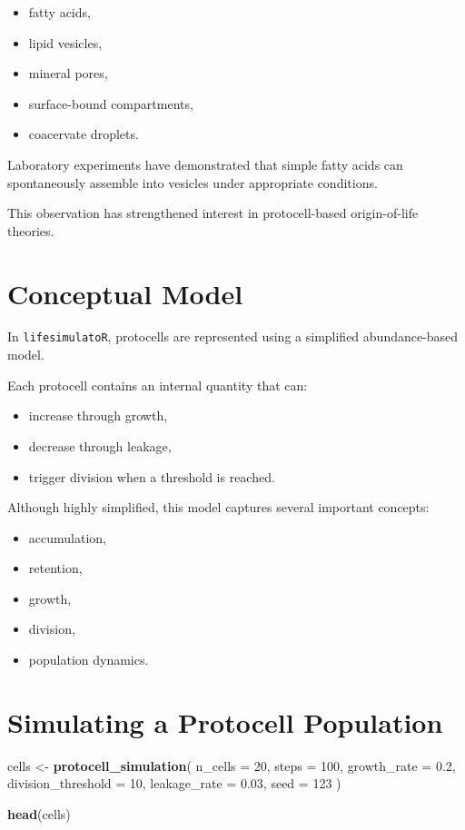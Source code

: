 \documentclass[
  oneside,
  openany]{book}
\newenvironment{Shaded}{\begin{snugshade}}{\end{snugshade}}
\newcommand{\AttributeTok}[1]{\textcolor[rgb]{0.13,0.29,0.53}{#1}}
\newcommand{\DecValTok}[1]{\textcolor[rgb]{0.00,0.00,0.81}{#1}}
\newcommand{\FloatTok}[1]{\textcolor[rgb]{0.00,0.00,0.81}{#1}}
\newcommand{\FunctionTok}[1]{\textcolor[rgb]{0.13,0.29,0.53}{\textbf{#1}}}
\newcommand{\NormalTok}[1]{#1}
\newcommand{\OtherTok}[1]{\textcolor[rgb]{0.56,0.35,0.01}{#1}}
\providecommand{\tightlist}{%
  \setlength{\itemsep}{0pt}\setlength{\parskip}{0pt}}
\begin{document}
\begin{itemize}
\tightlist
\item
  fatty acids,
\item
  lipid vesicles,
\item
  mineral pores,
\item
  surface-bound compartments,
\item
  coacervate droplets.
\end{itemize}

Laboratory experiments have demonstrated that simple fatty acids can spontaneously assemble into vesicles under appropriate conditions.

This observation has strengthened interest in protocell-based origin-of-life theories.

\section{Conceptual Model}\label{conceptual-model-3}

In \texttt{lifesimulatoR}, protocells are represented using a simplified abundance-based model.

Each protocell contains an internal quantity that can:

\begin{itemize}
\tightlist
\item
  increase through growth,
\item
  decrease through leakage,
\item
  trigger division when a threshold is reached.
\end{itemize}

Although highly simplified, this model captures several important concepts:

\begin{itemize}
\tightlist
\item
  accumulation,
\item
  retention,
\item
  growth,
\item
  division,
\item
  population dynamics.
\end{itemize}

\section{Simulating a Protocell Population}\label{simulating-a-protocell-population}

\begin{Shaded}
\begin{Highlighting}[]
\NormalTok{cells }\OtherTok{\textless{}{-}} \FunctionTok{protocell\_simulation}\NormalTok{(}
  \AttributeTok{n\_cells =} \DecValTok{20}\NormalTok{,}
  \AttributeTok{steps =} \DecValTok{100}\NormalTok{,}
  \AttributeTok{growth\_rate =} \FloatTok{0.2}\NormalTok{,}
  \AttributeTok{division\_threshold =} \DecValTok{10}\NormalTok{,}
  \AttributeTok{leakage\_rate =} \FloatTok{0.03}\NormalTok{,}
  \AttributeTok{seed =} \DecValTok{123}
\NormalTok{)}

\FunctionTok{head}\NormalTok{(cells)}
\end{Highlighting}
\end{Shaded}
\end{document}

